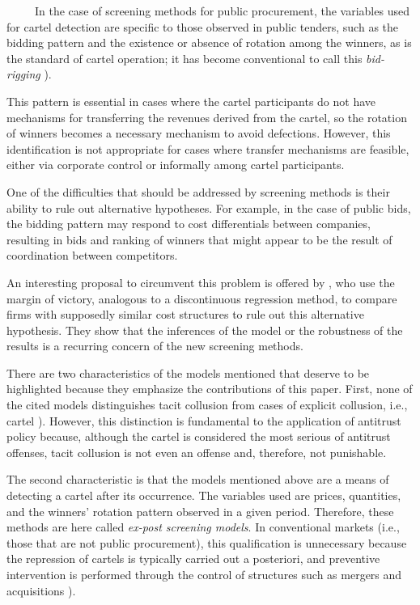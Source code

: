 \ \ \ \ \ In the case of screening methods for public procurement, the variables used for cartel detection are specific to those observed in public tenders, such as the bidding pattern and the existence or absence of rotation among the winners, as is the standard of cartel operation; it has become conventional to call this \textit{bid-rigging}  \cite{imhof2019detecting}).

 This pattern is essential in cases where the cartel participants do not have mechanisms for transferring the revenues derived from the cartel, so the rotation of winners becomes a necessary mechanism to avoid defections. However, this identification is not appropriate for cases where transfer mechanisms are feasible, either via corporate control or informally among cartel participants.

One of the difficulties that should be addressed by screening methods is their ability to rule out alternative hypotheses. For example, in the case of public bids, the bidding pattern may respond to cost differentials between companies, resulting in bids and ranking of winners that might appear to be the result of coordination between competitors.

An interesting proposal to circumvent this problem is offered by  \cite{kawai2019using}, who use the margin of victory, analogous to a discontinuous regression method, to compare firms with supposedly similar cost structures to rule out this alternative hypothesis. They show that the inferences of the model or the robustness of the results is a recurring concern of the new screening methods.

 There are two characteristics of the models mentioned that deserve to be highlighted because they emphasize the contributions of this paper. First, none of the cited models distinguishes tacit collusion from cases of explicit collusion, i.e., cartel  \cite{harrington2008detecting}). However, this distinction is fundamental to the application of antitrust policy because, although the cartel is considered the most serious of antitrust offenses, tacit collusion is not even an offense and, therefore, not punishable.

 The second characteristic is that the models mentioned above are a means of detecting a cartel after its occurrence. The variables used are prices, quantities, and the winners' rotation pattern observed in a given period. Therefore, these methods are here called \textit{ex-post screening models}. In conventional markets (i.e., those that are not public procurement), this qualification is unnecessary because the repression of cartels is typically carried out a posteriori, and preventive intervention is performed through the control of structures such as mergers and acquisitions  \cite{hovenkamp2005federal}).

